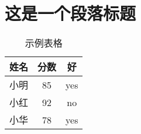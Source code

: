 \documentclass{article}
\begin{document}


\section{这是一个段落标题}

\begin{table}[htbp]
  \centering
  \caption{示例表格}
  \label{tab:example}
  \begin{tabular}{|c|c|c|}
    \hline
    姓名 & 分数 & 好\\
    \hline
    小明 & 85 & yes \\
    小红 & 92 & no \\
    小华 & 78 & yes \\
    \hline
  \end{tabular}
\end{table}

% 









\end{document}
